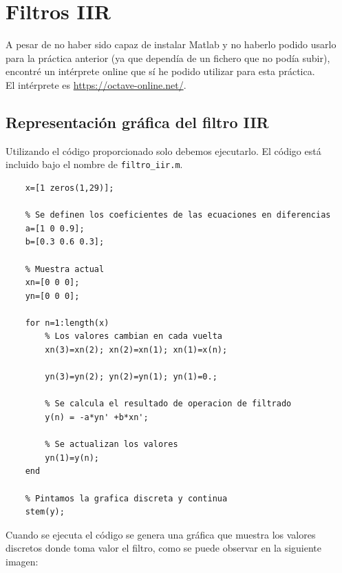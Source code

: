 \documentclass[11pt,a4paper]{article}
\begin{document}
\tableofcontents
\thispagestyle{empty}

\newpage

\section{Filtros IIR}

A pesar de no haber sido capaz de instalar Matlab y no haberlo podido usarlo para la práctica anterior (ya que dependía de un fichero que no podía subir), encontré un intérprete online que sí he podido utilizar para esta práctica.\\

El intérprete es \color{blue} \url{https://octave-online.net/}\color{black}.

\subsection{Representación gráfica del filtro IIR}

Utilizando el código proporcionado solo debemos ejecutarlo. El código está incluido bajo el nombre de \texttt{filtro\_iir.m}.

\begin{lstlisting}[frame=single]
	% Se definen los arrays con los pulsos
   	x=[1 zeros(1,29)];
   	
   	% Se definen los coeficientes de las ecuaciones en diferencias
	a=[1 0 0.9];
	b=[0.3 0.6 0.3];
	
	% Muestra actual
	xn=[0 0 0];
	yn=[0 0 0];
	
	for n=1:length(x)
		% Los valores cambian en cada vuelta
		xn(3)=xn(2); xn(2)=xn(1); xn(1)=x(n);
		
		yn(3)=yn(2); yn(2)=yn(1); yn(1)=0.;
		
		% Se calcula el resultado de operacion de filtrado
		y(n) = -a*yn' +b*xn';
		
		% Se actualizan los valores
		yn(1)=y(n);
	end
	
	% Pintamos la grafica discreta y continua
	stem(y);
\end{lstlisting}

Cuando se ejecuta el código se genera una gráfica que muestra los valores discretos donde toma valor el filtro, como se puede observar en la siguiente imagen:
\end{document}
